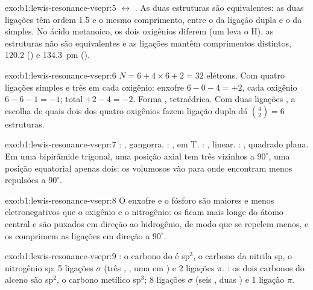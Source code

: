 \begin{solution}{exo:b1:lewis-resonance-vsepr:5}
$\leftrightarrow$
.
As duas estruturas são equivalentes: as duas ligações  têm ordem
1.5 e o mesmo comprimento, entre o da ligação dupla e o da simples. No
ácido metanoico, os dois oxigênios diferem (um leva o H), as estruturas
não são equivalentes e as ligações mantêm comprimentos distintos, 120.2
() e
\qty{134.3}{pm} ().
\end{solution}

\begin{solution}{exo:b1:lewis-resonance-vsepr:6}
$N = 6 + 4 \times 6 + 2 = 32$ elétrons. Com quatro ligações simples e três
 em cada oxigênio: enxofre $6 - 0 - 4 = +2$, cada
oxigênio $6 - 6 - 1 = -1$; total $+2 - 4 = -2$. Forma ,
tetraédrica. Com duas ligações , a escolha de quais dois dos
quatro oxigênios fazem ligação dupla dá $\binom{4}{2} = 6$ estruturas.
\end{solution}

\begin{solution}{exo:b1:lewis-resonance-vsepr:7}
: , gangorra. : , em T.
: , linear. : , quadrado plana. Em
uma bipirâmide trigonal, uma posição axial tem três vizinhos a
$90^\circ$, uma posição equatorial apenas dois: os volumosos  vão para onde encontram menos repulsões a $90^\circ$.
\end{solution}

\begin{solution}{exo:b1:lewis-resonance-vsepr:8}
O enxofre e o fósforo são maiores e menos eletronegativos que o oxigênio
e o nitrogênio: os  ficam mais longe do átomo central e são
puxados em direção ao hidrogênio, de modo que se repelem menos, e os  comprimem as ligações em direção a $90^\circ$.
\end{solution}

\begin{solution}{exo:b1:lewis-resonance-vsepr:9}
: o carbono do  é sp$^3$, o carbono da nitrila sp, o
nitrogênio sp; 5 ligações $\sigma$ (três , , uma em
) e 2 ligações $\pi$. : os dois carbonos do alceno
são sp$^2$, o carbono metílico sp$^3$; 8 ligações $\sigma$ (seis ,
duas ) e 1 ligação $\pi$.
\end{solution}

